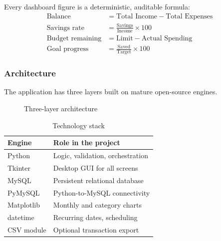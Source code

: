 \documentclass[12pt,a4paper]{article}
\begin{document}
Every dashboard figure is a deterministic, auditable formula:
\begin{align*}
  \text{Balance} &= \text{Total Income} - \text{Total Expenses}\\
  \text{Savings rate} &= \frac{\text{Savings}}{\text{Income}} \times 100\\
  \text{Budget remaining} &= \text{Limit} - \text{Actual Spending}\\
  \text{Goal progress} &= \frac{\text{Saved}}{\text{Target}} \times 100
\end{align*}

\subsubsection{Architecture}
The application has three layers built on mature open-source engines.

\begin{figure}[H]
\centering
{}
\caption{Three-layer architecture}
\end{figure}

\begin{table}[H]
\centering
\caption{Technology stack}
\begin{tabular}{@{}ll@{}}
  \toprule
  \textbf{Engine} & \textbf{Role in the project}\\
  \midrule
  Python & Logic, validation, orchestration\\
  Tkinter & Desktop GUI for all screens\\
  MySQL & Persistent relational database\\
  PyMySQL & Python-to-MySQL connectivity\\
  Matplotlib & Monthly and category charts\\
  datetime & Recurring dates, scheduling\\
  CSV module & Optional transaction export\\
  \bottomrule
\end{tabular}
\end{table}
\end{document}
